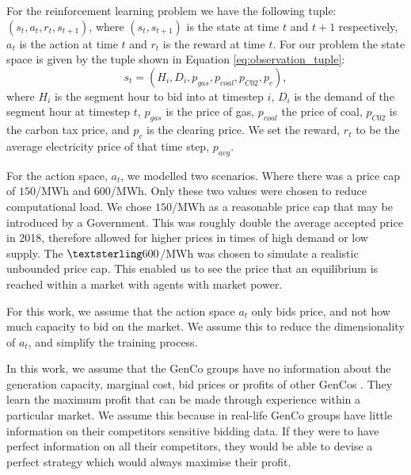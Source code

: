 For the reinforcement learning problem we have the following tuple: $(s_t,a_t,r_t,s_{t+1})$, where $(s_t, s_{t+1})$ is the state at time $t$ and $t+1$ respectively, $a_t$ is the action at time $t$ and $r_t$ is the reward at time $t$. For our problem the state space is given by the tuple shown in Equation \ref{eq:observation_tuple}:
\begin{equation}
\label{eq:observation_tuple}
s_t=(H_i,D_i,p_{gas},p_{coal},p_{C02},p_{c}),
\end{equation}
\noindent where $H_i$ is the segment hour to bid into at timestep $i$, $D_i$ is the demand of the segment hour at timestep $t$, $p_{gas}$ is the price of gas, $p_{coal}$ the price of coal, $p_{C02}$ is the carbon tax price, and $p_{c}$ is the clearing price. We set the reward, $r_t$ to be the average electricity price of that time step, $p_{avg}$.

For the action space, $a_t$, we modelled two scenarios. Where there was a price cap of \textsterling$150$/MWh and \textsterling$600$/MWh. Only these two values were chosen to reduce computational load. We chose \textsterling$150$/MWh as a reasonable price cap that may be introduced by a Government. This was roughly double the average accepted price in 2018, therefore allowed for higher prices in times of high demand or low supply. The $\textsterling 600$/MWh was chosen to simulate a realistic unbounded price cap. This enabled us to see the price that an equilibrium is reached within a market with agents with market power. 

For this work, we assume that the action space $a_t$ only bids price, and not how much capacity to bid on the market. We assume this to reduce the dimensionality of $a_t$, and simplify the training process.

In this work, we assume that the GenCo groups have no information about the generation capacity, marginal cost, bid prices or profits of other GenCos \cite{EsmaeiliAliabadi2017}. They learn the maximum profit that can be made through experience within a particular market. We assume this because in real-life GenCo groups have little information on their competitors sensitive bidding data. If they were to have perfect information on all their competitors, they would be able to devise a perfect strategy which would always maximise their profit.


